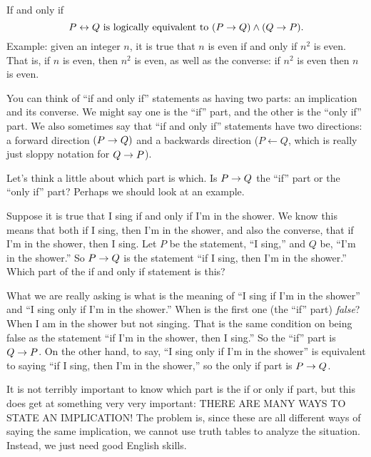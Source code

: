 \documentclass[12pt]{article}
\begin{document}
\begin{defbox}{If and only if}
\[ P \leftrightarrow Q \mbox{ is logically equivalent to } (P \rightarrow Q) \wedge (Q \rightarrow P).\]
Example: given an integer $n$, it is true that $n$ is even if and only if $n^2$ is even.  That is, if $n$ is even, then $n^2$ is even, as well as the converse: if $n^2$ is even then $n$ is even.
\end{defbox}

You can think of ``if and only if'' statements as having two parts: an implication and its converse.  We might say one is the ``if'' part, and the other is the ``only if'' part.  We also sometimes say that ``if and only if'' statements have two directions: a forward direction $(P \rightarrow Q)$ and a backwards direction ($P \leftarrow Q$, which is really just sloppy notation for $Q \rightarrow P$).

Let's think a little about which part is which.  Is $P \rightarrow Q$ the ``if'' part or the ``only if'' part?  Perhaps we should look at an example.

\begin{example}
 Suppose it is true that I sing if and only if I'm in the shower.  We know this means that both if I sing, then I'm in the shower, and also the converse, that if I'm in the shower, then I sing.  Let $P$ be the statement, ``I sing,'' and $Q$ be, ``I'm in the shower.''  So $P \rightarrow Q$ is the statement ``if I sing, then I'm in the shower.''  Which part of the if and only if statement is this?

 What we are really asking is what is the meaning of ``I sing if I'm in the shower'' and ``I sing only if I'm in the shower.''  When is the first one (the ``if'' part) {\em false}?  When I am in the shower but not singing.  That is the same condition on being false as the statement ``if I'm in the shower, then I sing.''  So the ``if'' part is $Q \rightarrow P$.  On the other hand, to say, ``I sing only if I'm in the shower'' is equivalent to saying ``if I sing, then I'm in the shower,'' so the only if part is $P \rightarrow Q$.
\end{example}

It is not terribly important to know which part is the if or only if part, but this does get at something very very important: THERE ARE MANY WAYS TO STATE AN IMPLICATION!  The problem is, since these are all different ways of saying the same implication, we cannot use truth tables to analyze the situation.  Instead, we just need good English skills.
\end{document}
